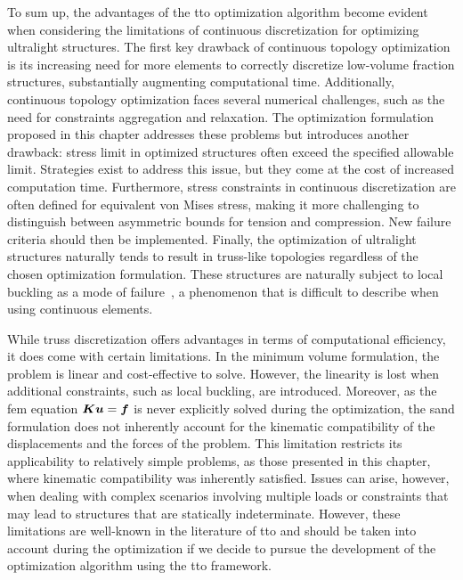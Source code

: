 To sum up, the advantages of the \gls{tto} optimization algorithm become evident when considering the limitations of continuous discretization for optimizing ultralight structures. The first key drawback of continuous topology optimization is its increasing need for more elements to correctly discretize low-volume fraction structures, substantially augmenting computational time. Additionally, continuous topology optimization faces several numerical challenges, such as the need for constraints aggregation and relaxation. The optimization formulation proposed in this chapter addresses these problems but introduces another drawback: stress limit in optimized structures often exceed the specified allowable limit. Strategies exist to address this issue, but they come at the cost of increased computation time. Furthermore, stress constraints in continuous discretization are often defined for equivalent von Mises stress, making it more challenging to distinguish between asymmetric bounds for tension and compression. New failure criteria should then be implemented. Finally, the optimization of ultralight structures naturally tends to result in truss-like topologies regardless of the chosen optimization formulation. These structures are naturally subject to local buckling as a mode of failure~, a phenomenon that is difficult to describe when using continuous elements.

While truss discretization offers advantages in terms of computational efficiency, it does come with certain limitations. In the minimum volume formulation, the problem is linear and cost-effective to solve. However, the linearity is lost when additional constraints, such as local buckling, are introduced. Moreover, as the \gls{fem} equation $\bm{K}\bm{u}=\bm{f}$ is never explicitly solved during the optimization, the \gls{sand} formulation does not inherently account for the kinematic compatibility of the displacements and the forces of the problem. This limitation restricts its applicability to relatively simple problems, as those presented in this chapter, where kinematic compatibility was inherently satisfied. Issues can arise, however, when dealing with complex scenarios involving multiple loads or constraints that may lead to structures that are statically indeterminate. However, these limitations are well-known in the literature of \gls{tto} and should be taken into account during the optimization if we decide to pursue the development of the optimization algorithm using the \gls{tto} framework.

